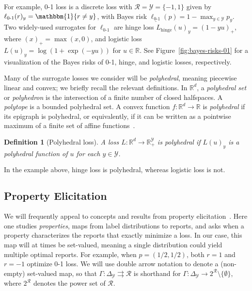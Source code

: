 \documentclass[11pt]{article}
\newcommand{\Comments}{1}
\newcommand{\mynote}[2]{\ifnum\Comments=1\textcolor{#1}{#2}\fi}
\newcommand{\jessie}[1]{\mynote{teal}{[JF: #1]}}
\newcommand{\reals}{\mathbb{R}}
\newcommand{\simplex}{\Delta_\Y}
\newcommand{\R}{\mathcal{R}}
\newcommand{\U}{\mathcal{U}}
\newcommand{\Y}{\mathcal{Y}}
\newcommand{\risk}[1]{\underline{#1}}
\newcommand{\toto}{\rightrightarrows}
\newcommand{\ones}{\mathbbm{1}}
\newcommand{\Ind}[1]{\ones\{#1\}}
\newcommand{\hinge}{L_{\mathrm{hinge}}}
\newcommand{\ellzo}{\ell_{\text{0-1}}}
\newtheorem{definition}{Definition}
\begin{document}
For example, 0-1 loss is a discrete loss with $\R = \Y = \{-1,1\}$
given by $\ellzo(r)_y = \Ind{r \neq y}$, with Bayes risk $\risk{\ellzo}(p) = 1-\max_{y\in\Y} p_y$.
Two widely-used surrogates for $\ellzo$ are hinge loss $\hinge(u)_y = (1-yu)_+$, where $(x)_+ = \max(x,0)$, and logistic loss $L(u)_y = \log(1+\exp(-yu))$ for $u\in\reals$.
See Figure~\ref{fig:bayes-risks-01} for a visualization of the Bayes risks of 0-1, hinge, and logistic losses, respectively.

Many of the surrogate losses we consider will be \emph{polyhedral}, meaning piecewise linear and convex; we briefly recall the relevant definitions.
In $\reals^d$, a \emph{polyhedral set} or \emph{polyhedron} is the intersection of a finite number of closed halfspaces.
A \emph{polytope} is a bounded polyhedral set.
A convex function $f:\reals^d\to\reals$ is \emph{polyhedral} if its epigraph is polyhedral, or equivalently, if it can be written as a pointwise maximum of a finite set of affine functions~\citep{rockafellar1997convex}.
%
\begin{definition}[Polyhedral loss]
  A loss $L: \reals^d \to \reals^{\Y}_+$ is \emph{polyhedral} if $L(u)_y$ is a polyhedral function of $u$ for each $y\in\Y$.
\end{definition}
\noindent
In the example above, hinge loss is polyhedral, whereas logistic loss is not.

\subsection{Property Elicitation}
\label{sec:property-elicitation}

We will frequently appeal to concepts and results from property elicitation~\citep{savage1971elicitation,osband1985information-eliciting,lambert2008eliciting,gneiting2011making,steinwart2014elicitation,frongillo2015vector-valued,lambert2018elicitation}.
Here one studies \emph{properties}, maps from label distributions to reports, and asks when a property characterizes the reports that exactly minimize a loss.
In our case, this map will at times be set-valued, meaning a single distribution could yield multiple optimal reports.
For example, when $p=(1/2,1/2)$, both $r=1$ and $r=-1$ optimize 0-1 loss.
We will use double arrow notation to denote a (non-empty) set-valued map, so that $\Gamma: \simplex \toto \R$ is shorthand for $\Gamma: \simplex \to 2^{\R} \setminus \{\emptyset\}$, where $2^\R$ denotes the power set of $\R$.
\end{document}
